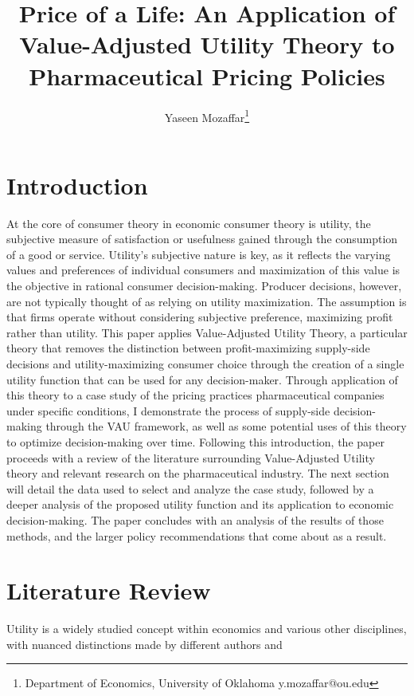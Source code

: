 \documentclass[12pt,english]{article} \usepackage{mathptmx}
\begin{document}
 \title{Price of a Life: An 
Application of Value-Adjusted Utility Theory to Pharmaceutical Pricing 
Policies} \author{Yaseen Mozaffar\thanks{Department of Economics, 
University of Oklahoma y.mozaffar@ou.edu}} \maketitle \vfill{} \pagebreak{} 
\section{Introduction}\label{sec:intro} At the core of consumer theory 
in economic consumer theory is utility, the subjective measure of 
satisfaction or usefulness gained through the consumption of a good or 
service. Utility's subjective nature is key, as it reflects the varying 
values and preferences of individual consumers and maximization of this 
value is the objective in rational consumer decision-making. Producer 
decisions, however, are not typically thought of as relying on utility 
maximization. The assumption is that firms operate without considering 
subjective preference, maximizing profit rather than utility. This paper 
applies Value-Adjusted Utility Theory, a particular theory that removes 
the distinction between profit-maximizing supply-side decisions and 
utility-maximizing consumer choice through the creation of a single 
utility function that can be used for any decision-maker. Through 
application of this theory to a case study of the pricing practices 
pharmaceutical companies under specific conditions, I demonstrate the 
process of supply-side decision-making through the VAU framework, as 
well as some potential uses of this theory to optimize decision-making 
over time. Following this introduction, the paper proceeds with a review 
of the literature surrounding Value-Adjusted Utility theory and relevant 
research on the pharmaceutical industry. The next section will detail 
the data used to select and analyze the case study, followed by a deeper 
analysis of the proposed utility function and its application to 
economic decision-making. The paper concludes with an analysis of the 
results of those methods, and the larger policy recommendations that 
come about as a result. \section{Literature Review}\label{sec:litreview} 
Utility is a widely studied concept within economics and various other 
disciplines, with nuanced distinctions made by different authors and 
\end{document}
